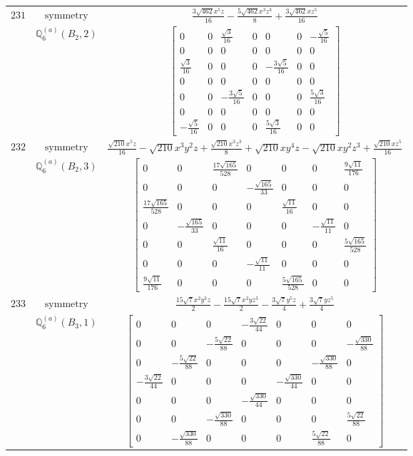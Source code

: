 \documentclass[fleqn,8pt,landscape]{jsarticle}
\begin{document}
\begin{longtable}{ccc}
$ 231 $ & $ \text{symmetry} $ & $ \frac{3 \sqrt{462} x^{5} z}{16} - \frac{5 \sqrt{462} x^{3} z^{3}}{8} + \frac{3 \sqrt{462} x z^{5}}{16} $ \\
$  $ & $ \mathbb{Q}_{6}^{(a)}(B_{2},2) $ & $ \begin{bmatrix} 0 & 0 & \frac{\sqrt{3}}{16} & 0 & 0 & 0 & - \frac{\sqrt{5}}{16} \\ 0 & 0 & 0 & 0 & 0 & 0 & 0 \\ \frac{\sqrt{3}}{16} & 0 & 0 & 0 & - \frac{3 \sqrt{5}}{16} & 0 & 0 \\ 0 & 0 & 0 & 0 & 0 & 0 & 0 \\ 0 & 0 & - \frac{3 \sqrt{5}}{16} & 0 & 0 & 0 & \frac{5 \sqrt{3}}{16} \\ 0 & 0 & 0 & 0 & 0 & 0 & 0 \\ - \frac{\sqrt{5}}{16} & 0 & 0 & 0 & \frac{5 \sqrt{3}}{16} & 0 & 0 \end{bmatrix} $ \\ \hline
$ 232 $ & $ \text{symmetry} $ & $ \frac{\sqrt{210} x^{5} z}{16} - \sqrt{210} x^{3} y^{2} z + \frac{\sqrt{210} x^{3} z^{3}}{8} + \sqrt{210} x y^{4} z - \sqrt{210} x y^{2} z^{3} + \frac{\sqrt{210} x z^{5}}{16} $ \\
$  $ & $ \mathbb{Q}_{6}^{(a)}(B_{2},3) $ & $ \begin{bmatrix} 0 & 0 & \frac{17 \sqrt{165}}{528} & 0 & 0 & 0 & \frac{9 \sqrt{11}}{176} \\ 0 & 0 & 0 & - \frac{\sqrt{165}}{33} & 0 & 0 & 0 \\ \frac{17 \sqrt{165}}{528} & 0 & 0 & 0 & \frac{\sqrt{11}}{16} & 0 & 0 \\ 0 & - \frac{\sqrt{165}}{33} & 0 & 0 & 0 & - \frac{\sqrt{11}}{11} & 0 \\ 0 & 0 & \frac{\sqrt{11}}{16} & 0 & 0 & 0 & \frac{5 \sqrt{165}}{528} \\ 0 & 0 & 0 & - \frac{\sqrt{11}}{11} & 0 & 0 & 0 \\ \frac{9 \sqrt{11}}{176} & 0 & 0 & 0 & \frac{5 \sqrt{165}}{528} & 0 & 0 \end{bmatrix} $ \\ \hline
$ 233 $ & $ \text{symmetry} $ & $ \frac{15 \sqrt{7} x^{2} y^{3} z}{2} - \frac{15 \sqrt{7} x^{2} y z^{3}}{2} - \frac{3 \sqrt{7} y^{5} z}{4} + \frac{3 \sqrt{7} y z^{5}}{4} $ \\
$  $ & $ \mathbb{Q}_{6}^{(a)}(B_{3},1) $ & $ \begin{bmatrix} 0 & 0 & 0 & - \frac{3 \sqrt{22}}{44} & 0 & 0 & 0 \\ 0 & 0 & - \frac{5 \sqrt{22}}{88} & 0 & 0 & 0 & - \frac{\sqrt{330}}{88} \\ 0 & - \frac{5 \sqrt{22}}{88} & 0 & 0 & 0 & - \frac{\sqrt{330}}{88} & 0 \\ - \frac{3 \sqrt{22}}{44} & 0 & 0 & 0 & - \frac{\sqrt{330}}{44} & 0 & 0 \\ 0 & 0 & 0 & - \frac{\sqrt{330}}{44} & 0 & 0 & 0 \\ 0 & 0 & - \frac{\sqrt{330}}{88} & 0 & 0 & 0 & \frac{5 \sqrt{22}}{88} \\ 0 & - \frac{\sqrt{330}}{88} & 0 & 0 & 0 & \frac{5 \sqrt{22}}{88} & 0 \end{bmatrix} $ \\ \hline

\end{longtable}
\end{document}
